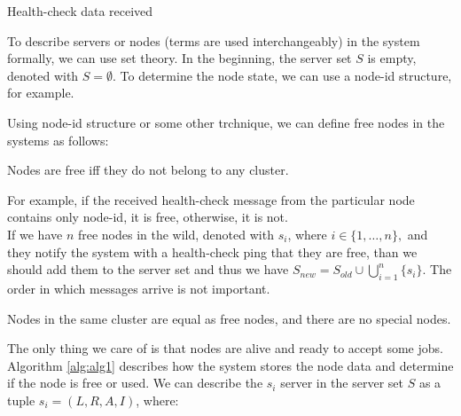 \begin{algorithm}[H]
	\SetAlgoLined
	\caption{Health-check data received}
	\label{alg:alg1}
\end{algorithm}

To describe servers or nodes (terms are used interchangeably) in the system formally, we can use set theory. In the beginning, the server set $S$ is empty, denoted with $S=\emptyset$. To determine the node state, we can use a node-id structure, for example. 

Using node-id structure or some other trchnique, we can define free nodes in the systems as follows:

\begin{definition}
	Nodes are free iff they do not belong to any cluster.
\end{definition}

\noindent 
For example, if the received health-check message from the particular node contains only node-id, it is free, otherwise, it is not.\\ 

If we have $n$ free nodes in the wild, denoted with $s_i$, where $i\in\{1, \ldots, n\},$ and they notify the system with a health-check ping that they are free, than we should add them to the server set and thus we have 
$S_{\mathit{new}} = S_{\mathit{old}} \cup \bigcup%
_{i=1}^{n} \{s_i\}$. 
The order in which messages arrive is not important. 

\begin{definition}
Nodes in the same cluster are equal as free nodes, and there are no special nodes. 
\end{definition}

\noindent
The only thing we care of is that nodes are alive and ready to accept some jobs. \\

Algorithm \ref{alg:alg1} describes how the system stores the node data and determine if the node is free or used.
We can describe the $s_i$ server in the server set $S$ as a tuple $s_i = (L, R, A, I)$, where:

